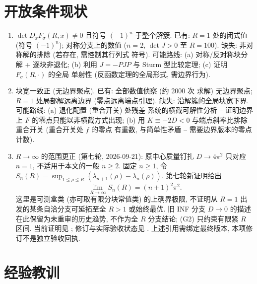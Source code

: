 \documentclass[UTF8]{ctexart}
\begin{document}
\section{开放条件现状}\label{sec:open}

\begin{enumerate}
	\item[(G1$'$)] $\det D_xF_\sigma(R,x)\neq0$ 且符号 $(-1)^n$ 于整个解簇.
	已有: $R=1$ 处的闭式值 (符号 $(-1)^n$); 对称分支上的数值 ($n=2$,
	$\det J>0$ 至 $R=100$). 缺失: 非对称解的排除 (若存在, 需控制其行列式
	符号). 可能路线: (a) 对称/反对称块分解 + 逐块非退化; (b) 利用
	$J=-PJP$ 与 Sturm 型比较定理; (c) 证明 $F_\sigma(R,\cdot)$ 的全局
	单射性 (反函数定理的全局形式, 需边界行为).
	\item[(G2)] 块宽一致正 (无边界聚点). 已有: 全部数值侦察 (约 2000 次
	求解) 无边界聚点; $R=1$ 处局部解远离边界 (零点远离端点引理).
	缺失: 沿解簇的全局块宽下界. 可能路线: (a) 退化配置 (重合开关) 处残差
	系统的横截可解性分析 -- 证明边界上 $F$ 的零点只能以非横截方式出现;
	(b) 用 $K\equiv-2D<0$ 与端点斜率比排除重合开关 (重合开关处 $f$ 的零点
	有重数, 与简单性矛盾 -- 需要边界版本的零点计数).
	\item $R\to\infty$ 的范围更正 (第七轮, 2026-09-21): 原中心质量钉扎
	$D\to4\pi^2$ 只对应 $n=1$, 不适用于本文的一般 $n\ge2$.
	固定 $n\ge1$, 令 $S_n(R)=\sup_{1\le\rho\le R}
	(\lambda_{n+1}(\rho)-\lambda_n(\rho))$. 第七轮新证明给出
	\[
	\lim_{R\to\infty}S_n(R)=(n+1)^2\pi^2.
	\]
	这里是可测盒类 (亦可取有限分块常值类) 的上确界极限,
	不证明从 $R=1$ 出发的某条自洽分支可延拓至全 $R>1$ 或始终最优.
	旧 INF 分支 $D\to0$ 的描述在此保留为未重审的历史趋势,
	不作为全 $R$ 分支结论; (G2) 只约束有限紧 $R$ 区间.
	当前证明见 ;
	修订与实际验收状态见 .
	上述引用需绑定最终版本, 本项修订不是独立验收回执.
\end{enumerate}

\section{经验教训}
\end{document}
